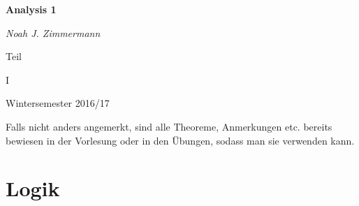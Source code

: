 \documentclass[headsepline,12pt,a4paper]{scrartcl}
\begin{document}
\begin{titlepage}
	\centering
	{\huge\bfseries Analysis 1\par}
	\vspace{2cm}
	{\Large\itshape Noah J. Zimmermann\par}
	\vfill
	Teil\par
	 \textsc{I}

	\vfill

	{\large Wintersemester 2016/17\par}
\end{titlepage}

\tableofcontents

\newpage

Falls nicht anders angemerkt, sind alle Theoreme, Anmerkungen etc. bereits bewiesen in der Vorlesung oder in den Übungen, sodass man sie verwenden kann. \\

\section*{Logik}
\end{document}
